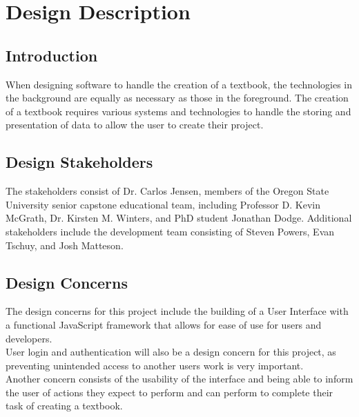 \documentclass[onecolumn, draftclsnofoot,10pt, compsoc]{IEEEtran}
\begin{document}
\section{Design Description}


\subsection{Introduction}
\noindent When designing software to handle the creation of a textbook,
the technologies in the background are equally as necessary as those in 
the foreground. The creation of a textbook requires various systems 
and technologies to handle the storing and presentation of data to allow 
the user to create their project.\\


\subsection{Design Stakeholders}
\noindent The stakeholders consist of Dr. Carlos Jensen, members of the Oregon
State University senior capstone educational team, including Professor 
D. Kevin McGrath, Dr. Kirsten M. Winters, and PhD student Jonathan Dodge.
Additional stakeholders include the development team consisting of 
Steven Powers, Evan Tschuy, and Josh Matteson.\\

\subsection{Design Concerns}
\noindent The design concerns for this project include the building of a 
User Interface with a functional JavaScript framework that allows for 
ease of use for users and developers. \\

\noindent User login and authentication will also be a design concern for 
this project, as preventing unintended access to another users work is 
very important. \\

\noindent Another concern consists of the usability of the interface 
and being able to inform the user of actions they expect to perform and can perform to complete their task of creating a textbook. \\
\end{document}
